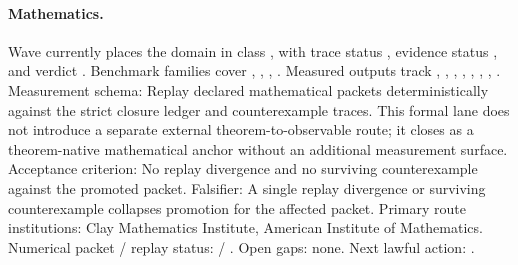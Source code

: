 \paragraph{Mathematics.}
Wave  currently places the domain in class , with trace status , evidence status , and verdict .
Benchmark families cover , \allowbreak {}, \allowbreak {}, \allowbreak {}.
Measured outputs track , \allowbreak {}, \allowbreak {}, \allowbreak {}, \allowbreak {}, \allowbreak {}, \allowbreak {}, \allowbreak {}.
Measurement schema: Replay declared mathematical packets deterministically against the strict closure ledger and counterexample traces.
This formal lane does not introduce a separate external theorem-to-observable route; it closes as a theorem-native mathematical anchor without an additional measurement surface.
Acceptance criterion: No replay divergence and no surviving counterexample against the promoted packet.
Falsifier: A single replay divergence or surviving counterexample collapses promotion for the affected packet.
Primary route institutions: Clay Mathematics Institute, \allowbreak American Institute of Mathematics.
Numerical packet / replay status:  / .
Open gaps: none.
Next lawful action: .

